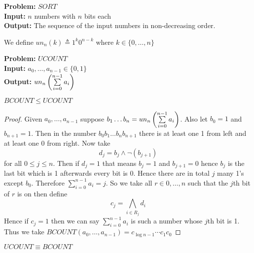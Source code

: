 \parinf

\textbf{Problem:} $SORT$\\
\textbf{Input:} $n$ numbers with $n$ bits each\\
\textbf{Output:} The sequence of the input numbers in non-decreasing order.
\begin{definition}
	We define $un_n(k)\triangleq 1^k0^{n-k}$ where $k\in\{0,\dots,n\}$
\end{definition}
\parinf
\textbf{Problem:} $UCOUNT$\\
\textbf{Input:} $a_0,\dots,a_{n-1}\in \{0,1\}$\\[2mm]
\textbf{Output:} $un_n\left(\sum\limits_{i=0}^{n-1}a_i \right)$\parinn
\begin{lemma}
	$BCOUNT\leq UCOUNT$
\end{lemma}
\begin{proof}
	Given $a_0,\dots, a_{n-1}$ suppose $b_1\dots b_n=un_n\left( \sum\limits_{i=0}^{n-1}a_i\right)$. Also let $b_0=1$ and $b_{n+1}=1$. Then in the number $b_0b_1\dots b_nb_{n+1}$ there is at least one 1 from left and at least one 0 from right. Now take $$d_j=b_j\wedge \neg(b_{j+1})$$ for all $0\leq j\leq n$. Then if $d_j=1$ that means $b_j=1$ and $b_{j+1}=0$ hence $b_j$ is the last bit which is 1 afterwards every bit is 0. Hence there are in total $j$ many 1's except $b_0$. Therefore $\sum\limits_{i=0}^{n-1}a_i=j$. So we take all $r\in {0,\dots, n}$ such that the $j$th bit of $r$ is on then define $$c_j=\bigwedge_{i\in R_j}d_i$$Hence if $c_j=1$ then we can say $\sum\limits_{i=0}^{n-1}a_i$ is such a number whose $j$th bit is 1. Thus we take $BCOUNT(a_0,\dots, a_{n-1})=c_{\log n-1}\cdots c_1c_0$
\end{proof}

\begin{theorem}
	$UCOUNT\equiv BCOUNT$
\end{theorem}

